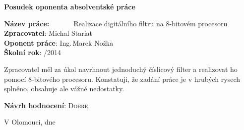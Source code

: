 \documentclass[12pt,a4paper]{article}
\begin{document}
\par\vspace*{6mm}\par
{\hspace{\fill}\LARGE \bf Posudek oponenta absolventské práce\hspace{\fill}}
\par\vspace*{7mm}\par

\begin{tabbing}
    \textbf{Název práce:}~~~~~~~\=Realizace digitálního filtru na 8-bitovém procesoru\\
    \textbf{Zpracovatel}: \> Michal Stariat \\
    \textbf{Oponent práce}: \> Ing.\,Marek Nožka \\
    \textbf{Školní rok}: /2014 \\
    \hr
\end{tabbing}

Zpracovatel měl za úkol navrhnout jednoduchý číslicový filter a realizovat ho
pomocí 8-bitového procesoru. Konstatuji, že zadání práce je v hrubých rysech 
splněno, obsahuje ale vážné nedostatky.

\par\vspace*{8mm}\par

\noindent \textbf{Návrh hodnocení}: \textsc{Dobře}

\par\vspace*{8mm}\par

\noindent V Olomouci, dne  
\par\vspace*{0mm}\par{}
\end{document}
